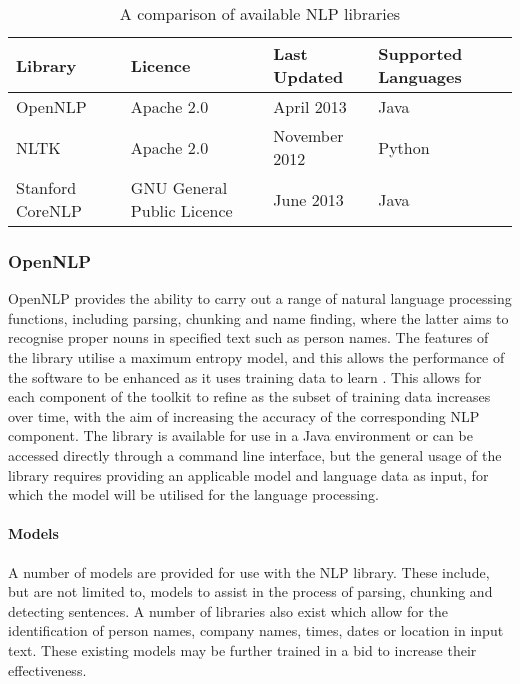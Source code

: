 \begin{table}[!ht]
    \centering
    \begin{tabular}{|p{3.5cm}|p{4cm}|p{3.5cm}|p{2.5cm}|}
    \hline
    \textbf{Library} & \textbf{Licence}           & \textbf{Last Updated}  & \textbf{Supported Languages} \\ \hline
    OpenNLP          & Apache 2.0                 &  April 2013   & Java                \\ \hline
    NLTK             & Apache 2.0                 & November 2012 & Python              \\ \hline
    Stanford CoreNLP & GNU General Public Licence & June 2013     & Java                \\ \hline
    \end{tabular}
    \caption {A comparison of available NLP libraries}
\end{table}

\subsubsection{OpenNLP}

OpenNLP provides the ability to carry out a range of natural language processing functions, including parsing, chunking and name finding, where the latter aims to recognise proper nouns in specified text such as person names. The features of the library utilise a maximum entropy model, and this allows the performance of the software to be enhanced as it uses training data to learn \citep{apache13}. This allows for each component of the toolkit to refine as the subset of training data increases over time, with the aim of increasing the accuracy of the corresponding NLP component. The library is available for use in a Java environment or can be accessed directly through a command line interface, but the general usage of the library requires providing an applicable model and language data as input, for which the model will be utilised for the language processing.

\paragraph{Models}

A number of models are provided for use with the NLP library. These include, but are not limited to, models to assist in the process of parsing, chunking and detecting sentences. A number of libraries also exist which allow for the identification of person names, company names, times, dates or location in input text. These existing models may be further trained in a bid to increase their effectiveness.

